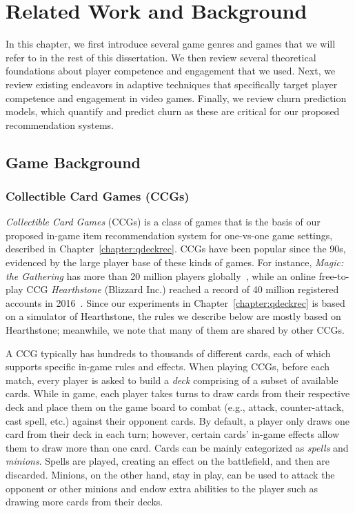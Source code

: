 \chapter{Related Work and Background} %

\label{chapter:relatework} 

In this chapter, we first introduce several game genres and games that we will refer to in the rest of this dissertation. We then review several theoretical foundations about player competence and engagement that we used. Next, we review existing endeavors in adaptive techniques that specifically target player competence and engagement in video games. Finally, we review churn prediction models, which quantify and predict churn as these are critical for our proposed recommendation systems.

\section{Game Background}

\subsection{Collectible Card Games (CCGs)}\label{sec:background_ccg}
 \textit{Collectible Card Games} (CCGs) is a class of games that is the basis of our proposed in-game item recommendation system for one-vs-one game settings, described in Chapter~\ref{chapter:qdeckrec}. CCGs have been popular since the 90s, evidenced by the large player base of these kinds of games. For instance, \textit{Magic: the Gathering} has more than 20 million players globally~\citep{guinnessmagic}, while an online free-to-play CCG \textit{Hearthstone} (Blizzard Inc.) reached a record of 40 million registered accounts in 2016~\citep{hearthstonepopular}. Since our experiments in Chapter~\ref{chapter:qdeckrec} is based on a simulator of Hearthstone, the rules we describe below are mostly based on Hearthstone; meanwhile, we note that many of them are shared by other CCGs.

A CCG typically has hundreds to thousands of different cards, each of which supports specific in-game rules and effects. When playing CCGs, before each match, every player is asked to build a \textit{deck} comprising of a subset of available cards. While in game, each player takes turns to draw cards from their respective deck and place them on the game board to combat (e.g., attack, counter-attack, cast spell, etc.) against their opponent cards. By default, a player only draws one card from their deck in each turn; however, certain cards' in-game effects allow them to draw more than one card. Cards can be mainly categorized as \textit{spells} and \textit{minions}. Spells are played, creating an effect on the battlefield, and then are discarded. Minions, on the other hand, stay in play, can be used to attack the opponent or other minions and endow extra abilities to the player such as drawing more cards from their decks. 

